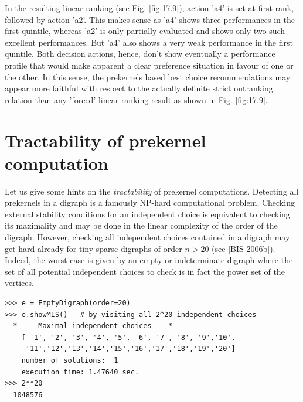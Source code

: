 In the resulting linear ranking (see Fig. \ref{fig:17.9}), action 'a4' is set at first rank, followed by action 'a2'. This makes sense as 'a4' shows three performances in the first quintile, whereas 'a2' is only partially evaluated and shows only two such excellent performances. But 'a4' also shows a very weak performance in the first quintile. Both decision actions, hence, don't show eventually a performance profile that would make apparent a clear preference situation in favour of one or the other. In this sense, the prekernels based best choice recommendations may appear more faithful with respect to the actually definite strict outranking relation than any 'forced' linear ranking result as shown in Fig. \ref{fig:17.9}.

\section{Tractability of prekernel computation}
\label{sec:17.5}

Let us give some hints on the \emph{tractability} of prekernel computations. Detecting all prekernels in a digraph is a famously NP-hard computational problem. Checking external stability conditions for an independent choice is equivalent to checking its maximality and may be done in the linear complexity of the order of the digraph. However, checking all independent choices contained in a digraph may get hard already for tiny sparse digraphs of order $n > 20$ (see [BIS-2006b]). Indeed, the worst case is given by an empty or indeterminate digraph where the set of all potential independent choices to check is in fact the power set of the vertices.
\begin{lstlisting}
>>> e = EmptyDigraph(order=20)
>>> e.showMIS()   # by visiting all 2^20 independent choices
  *---  Maximal independent choices ---*
    [ '1', '2', '3', '4', '5', '6', '7', '8', '9','10',
     '11','12','13','14','15','16','17','18','19','20']
    number of solutions:  1
    execution time: 1.47640 sec.
>>> 2**20
  1048576
\end{lstlisting}

